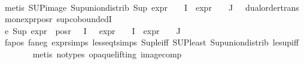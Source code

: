 \begin{isabellebody}
\ \ \ \ \ \ \isamarkupfalse%
\ {\isacharparenleft}{\kern0pt}metis\ SUP{\isacharunderscore}{\kern0pt}image\ Sup{\isacharunderscore}{\kern0pt}union{\isacharunderscore}{\kern0pt}distrib\ {\isacartoucheopen}Sup\ {\isacharparenleft}{\kern0pt}{\isacharparenleft}{\kern0pt}expr{\isacharunderscore}{\kern0pt}{}\ {\isasymcirc}\ {\isasymPhi}{\isacharparenright}{\kern0pt}\ {\isacharbackquote}{\kern0pt}\ I\ {\isasymunion}\ {\isacharparenleft}{\kern0pt}expr{\isacharunderscore}{\kern0pt}{}\ {\isasymcirc}\ {\isasymPhi}{\isacharparenright}{\kern0pt}\ {\isacharbackquote}{\kern0pt}\ J{\isacharparenright}{\kern0pt}\ {\isasymle}\ {}{\isacartoucheclose}\ dual{\isacharunderscore}{\kern0pt}order{\isachardot}{\kern0pt}trans\ mon{\isacharunderscore}{\kern0pt}expr{\isacharunderscore}{\kern0pt}{}{\isacharunderscore}{\kern0pt}pos{\isacharunderscore}{\kern0pt}r\ sup{\isachardot}{\kern0pt}coboundedI{}{\isacharparenright}{\kern0pt}\isanewline
\ \ \ \ \isamarkupfalse%
\ e{}{\isacharcolon}{\kern0pt}\ {\isachardoublequoteopen}Sup\ {\isacharparenleft}{\kern0pt}{\isacharparenleft}{\kern0pt}expr{\isacharunderscore}{\kern0pt}{}\ {\isacharbackquote}{\kern0pt}\ {\isacharparenleft}{\kern0pt}pos{\isacharunderscore}{\kern0pt}r\ {\isacharparenleft}{\kern0pt}{\isasymPhi}\ {\isacharbackquote}{\kern0pt}\ I{\isacharparenright}{\kern0pt}{\isacharparenright}{\kern0pt}{\isacharparenright}{\kern0pt}\ \ {\isasymunion}\ {\isacharparenleft}{\kern0pt}expr{\isacharunderscore}{\kern0pt}{}\ {\isasymcirc}\ {\isasymPhi}{\isacharparenright}{\kern0pt}\ {\isacharbackquote}{\kern0pt}\ I\ {\isasymunion}\ {\isacharparenleft}{\kern0pt}expr{\isacharunderscore}{\kern0pt}{}\ {\isasymcirc}\ {\isasymPhi}{\isacharparenright}{\kern0pt}\ {\isacharbackquote}{\kern0pt}\ J{\isacharparenright}{\kern0pt}\ {\isasymle}\ {}{\isachardoublequoteclose}\isanewline
\ \ \ \ \ \ \isamarkupfalse%
\ fa{\isacharunderscore}{\kern0pt}pos\ fa{\isacharunderscore}{\kern0pt}neg\ expr{\isachardot}{\kern0pt}simps\ less{\isacharunderscore}{\kern0pt}eq{\isacharunderscore}{\kern0pt}t{\isachardot}{\kern0pt}simps\ Sup{\isacharunderscore}{\kern0pt}le{\isacharunderscore}{\kern0pt}iff\ SUP{\isacharunderscore}{\kern0pt}least\ Sup{\isacharunderscore}{\kern0pt}union{\isacharunderscore}{\kern0pt}distrib\ le{\isacharunderscore}{\kern0pt}sup{\isacharunderscore}{\kern0pt}iff\isanewline
\ \ \ \ \ \ \isamarkupfalse%
\ {\isacharparenleft}{\kern0pt}metis\ {\isacharparenleft}{\kern0pt}no{\isacharunderscore}{\kern0pt}types{\isacharcomma}{\kern0pt}\ opaque{\isacharunderscore}{\kern0pt}lifting{\isacharparenright}{\kern0pt}\ image{\isacharunderscore}{\kern0pt}comp{\isacharparenright}{\kern0pt}\isanewline

\end{isabellebody}
